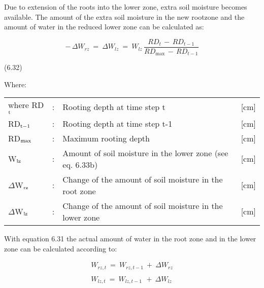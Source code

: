  Due to extension of the roots into the lower zone, extra soil moisture becomes available.
The amount of the extra soil moisture in the new rootzone and the amount of water in the
reduced lower zone can be calculated as:

\begin{equation}
-\, \Delta W _{rz} ~=~\Delta W _{lz} ~=~ W _{lz} \,{\frac{ RD _{t} \, -\, RD _{t-1} }{RD _{\max } \, -\, RD _{t-1} }}
\end{equation}

 
\strut\hfill (6.32)

Where:\\
\begin{tabularx}{\textwidth}{llXr}



where RD$_{{\rm t}}$ &:& Rooting depth at time step t  & [cm]\\
RD$_{{\rm t-1}}$ &:& Rooting depth at time step t-1  & [cm]\\
RD$_{{\rm max}}$ &:& Maximum rooting depth  & [cm]\\
W$_{{\rm lz}}$ &:& Amount of soil moisture in the lower zone (see eq. 6.33b)  & [cm]\\
$\Delta$W$_{{\rm rz}}$ &:& Change of the amount of soil moisture in the root zone  & [cm]\\
$\Delta$W$_{{\rm lz}}$ &:& Change of the amount of soil moisture in the lower zone  & [cm]
\end{tabularx}



With equation 6.31 the actual amount of water in the root zone and in the lower zone can
be calculated according to:

\begin{eqnarray*}
 W _{rz,t} ~=~ W _{rz, t-1} ~+~ \Delta W _{rz} \nonumber  \\
~ \nonumber  \\
W _{lz,t} ~=~ W _{lz, t-1} ~\, +~ \Delta W _{lz}
\end{eqnarray*}

